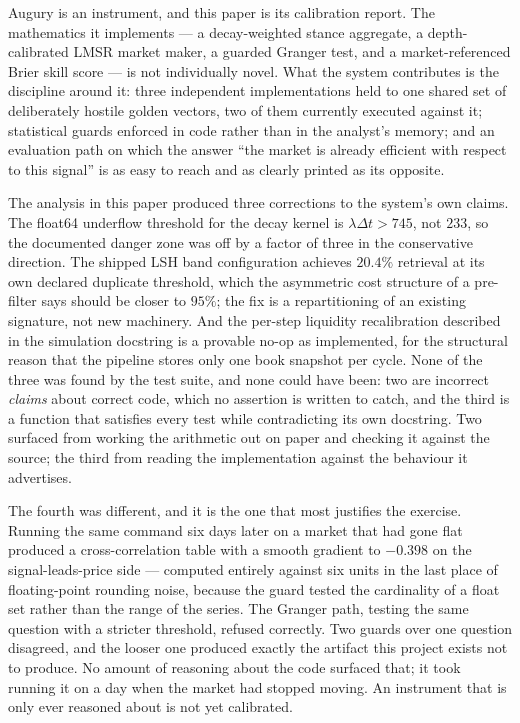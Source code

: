 \documentclass[11pt]{article}
\begin{document}
Augury is an instrument, and this paper is its calibration report. The
mathematics it implements --- a decay-weighted stance aggregate, a
depth-calibrated LMSR market maker, a guarded Granger test, and a
market-referenced Brier skill score --- is not individually novel. What the
system contributes is the discipline around it: three independent
implementations held to one shared set of deliberately hostile golden vectors,
two of them currently executed against it; statistical guards enforced in code
rather than in the analyst's memory; and an evaluation path on which the answer ``the market is already
efficient with respect to this signal'' is as easy to reach and as clearly
printed as its opposite.

The analysis in this paper produced three corrections to the system's own
claims. The float64 underflow threshold for the decay kernel is
$\lambda \Delta t > 745$, not $233$, so the documented danger zone was off by a
factor of three in the conservative direction. The shipped LSH band
configuration achieves $20.4\%$ retrieval at its own declared duplicate
threshold, which the asymmetric cost structure of a pre-filter says should be
closer to $95\%$; the fix is a repartitioning of an existing signature, not new
machinery. And the per-step liquidity recalibration described in the simulation
docstring is a provable no-op as implemented, for the structural reason that the
pipeline stores only one book snapshot per cycle. None of the three was found by
the test suite, and none could have been: two are incorrect \emph{claims} about
correct code, which no assertion is written to catch, and the third is a
function that satisfies every test while contradicting its own docstring. Two
surfaced from working the arithmetic out on paper and checking it against the
source; the third from reading the implementation against the behaviour it
advertises.

The fourth was different, and it is the one that most justifies the exercise.
Running the same command six days later on a market that had gone flat produced
a cross-correlation table with a smooth gradient to $-0.398$ on the
signal-leads-price side --- computed entirely against six units in the last
place of floating-point rounding noise, because the guard tested the cardinality
of a float set rather than the range of the series. The Granger path, testing
the same question with a stricter threshold, refused correctly. Two guards over
one question disagreed, and the looser one produced exactly the artifact this
project exists not to produce. No amount of reasoning about the code surfaced
that; it took running it on a day when the market had stopped moving. An
instrument that is only ever reasoned about is not yet calibrated.
\end{document}
